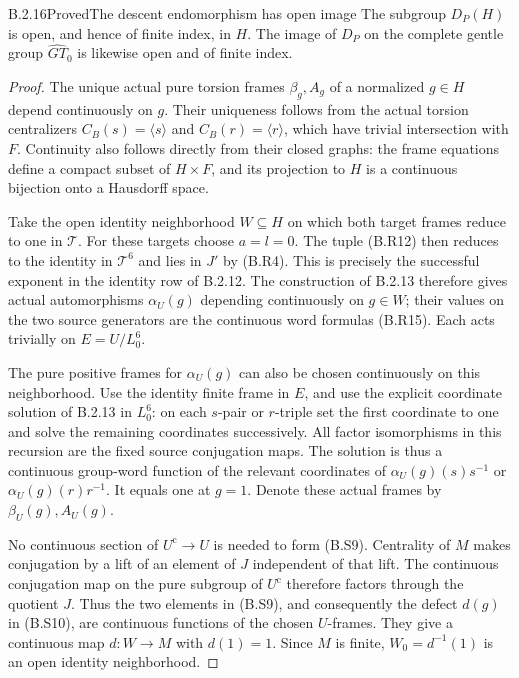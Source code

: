 \begin{result}{B.2.16}{Proved}{The descent endomorphism has open image}
The subgroup $D_P(H)$ is open, and hence of finite index,
in $H$.  The image of $D_P$ on the complete gentle group
$\widehat{GT}_0$ is likewise open and of finite index.
\end{result}

\begin{proof}
The unique actual pure torsion frames $\beta_g,A_g$ of a
normalized $g\in H$ depend continuously on $g$.  Their
uniqueness follows from the actual torsion centralizers
$C_B(s)=\langle s\rangle$ and
$C_B(r)=\langle r\rangle$, which have trivial intersection
with $F$.  Continuity also follows directly from their
closed graphs: the frame equations define a compact
subset of $H\times F$, and its projection to $H$ is a
continuous bijection onto a Hausdorff space.

Take the open identity neighborhood $W\subseteq H$ on
which both target frames reduce to one in $\mathcal T$.
For these targets choose $a=l=0$.  The tuple (B.R12)
then reduces to the identity in $\mathcal T^6$ and lies
in $J'$ by (B.R4).  This is precisely the successful
exponent in the identity row of B.2.12.  The construction
of B.2.13 therefore gives actual automorphisms
$\alpha_U(g)$ depending continuously on $g\in W$;
their values on the two source generators are the
continuous word formulas (B.R15).  Each acts trivially
on $E=U/L_0^6$.

The pure positive frames for $\alpha_U(g)$ can also be
chosen continuously on this neighborhood.  Use the
identity finite frame in $E$, and use the explicit
coordinate solution of B.2.13 in $L_0^6$: on each
$s$-pair or $r$-triple set the first coordinate to one
and solve the remaining coordinates successively.
All factor isomorphisms in this recursion are the
fixed source conjugation maps.  The solution is thus
a continuous group-word function of the relevant
coordinates of $\alpha_U(g)(s)s^{-1}$ or
$\alpha_U(g)(r)r^{-1}$.  It equals one at $g=1$.
Denote these actual frames by $\beta_U(g),A_U(g)$.

No continuous section of $U^{\mathrm c}\to U$ is needed
to form (B.S9).  Centrality of $M$ makes conjugation
by a lift of an element of $J$ independent of that
lift.  The continuous conjugation map on the pure
subgroup of $U^{\mathrm c}$ therefore factors through
the quotient $J$.  Thus the two elements in (B.S9),
and consequently the defect $d(g)$ in (B.S10), are
continuous functions of the chosen $U$-frames.
They give a continuous map $d:W\to M$ with $d(1)=1$.
Since $M$ is finite, $W_0=d^{-1}(1)$ is an open
identity neighborhood.


\end{proof}
